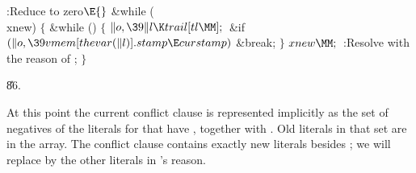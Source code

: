 \B{}:Reduce  to zero\X${}\E{}$\6
\&{while} (\\{xnew})\5
${}\{{}$\1\6
\&{while} ()\5
${}\{{}$\1\6
${}\|o,\39\|l\K\\{trail}[\\{tl}\MM];{}$\6
\&{if} ${}(\|o,\39\\{vmem}[\\{thevar}(\|l)].\\{stamp}\E\\{curstamp}){}$\1\5
\&{break};\2\6
\4${}\}{}$\2\6
${}\\{xnew}\MM;{}$\6
:Resolve with the reason of \X;\6
\4${}\}{}$\2\par
\U86.\fi

At this point the current conflict clause is represented
implicitly
as the set of negatives of the literals  for  that
have ,
together with . Old literals in that set are in the 
array. The conflict clause contains exactly
 new literals besides ; we will replace %
by the other literals in 's reason.

